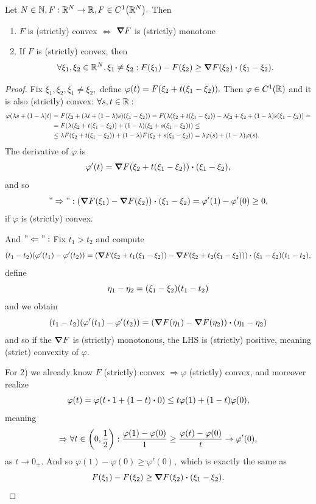 \documentclass{article}
\begin{document}
\begin{lemma}
	Let $N \in {\mathbb N}, F: {\mathbb R}^N \to {\mathbb R}, F \in C^1\qty({\mathbb R}^N).$ Then 
	\begin{enumerate}
		\item $F$ is (strictly) convex $\Leftrightarrow$ $\grad F$ is (strictly) monotone
		\item If $F$ is (strictly) convex, then
			\[
				\forall \xi_1, \xi_2 \in \R^N, \xi_1 \neq \xi_2: F\qty(\xi_1)-F\qty(\xi_2)\geq \grad F\qty(\xi_2)\vdot \qty(\xi_1 - \xi_2).
			\]
	\end{enumerate}
\end{lemma}
\begin{proof}
	Fix $\xi_1, \xi_2, \xi_1 \neq \xi_2,$ define $\varphi(t) = F\qty(\xi_2 + t\qty(\xi_1 - \xi_2)).$ Then $\varphi \in C^1\qty({\mathbb R})$ and it is also (strictly) convex: $\forall s,t \in {\mathbb R}:$ 
	\begin{align*}
		\varphi\qty(\lambda s + (1- \lambda)t) &= F\qty(\xi_2 + \qty(\lambda t + \qty(1-\lambda)s)\qty(\xi_1 - \xi_2)) = F\qty(\lambda\qty(\xi_2 + t\qty(\xi_1 - \xi_2))- \lambda \xi_2 + \xi_2 + \qty(1-\lambda)s\qty(\xi_1 - \xi_2)) = \\
						       &= F\qty(\lambda\qty(\xi_2 + t\qty(\xi_1 - \xi_2))+ \qty(1- \lambda)\qty(\xi_2 + s\qty(\xi_1 - \xi_2))) \leq \\
						       &\leq \lambda F\qty(\xi_2 + t\qty(\xi_1 - \xi_2)) + \qty(1- \lambda)F\qty(\xi_2 +s \qty(\xi_1 - \xi_2)) = \lambda \varphi(s) + (1-\lambda) \varphi(s).
	\end{align*}
	The derivative of $\varphi$ is 
	\[
		\varphi'(t) = \grad F\qty(\xi_2 +t\qty(\xi_1 - \xi_2))\vdot \qty(\xi_1 - \xi_2),
	\]
	and so
	\[
		"\Rightarrow": \qty(\grad F\qty(\xi_1) - \grad F\qty(\xi_2))\vdot\qty(\xi_1-\xi_2) = \varphi'(1)-\varphi'(0) \geq 0,
	\]
	if $\varphi$ is (strictly) convex.
	
	And $"\Leftarrow":$ Fix $t_1 > t_2$ and compute
	\[
		(t_1 - t_2)	(\varphi'\qty(t_1) - \varphi'\qty(t_2)) = \qty(\grad F\qty(\xi_2 + t_1\qty(\xi_1 - \xi_2))- \grad F\qty(\xi_2 + t_2\qty(\xi_1-\xi_2)))\vdot\qty(\xi_1-\xi_2)(t_1-t_2),
	\]
	define
	\[
		\eta_1 - \eta_2 = \qty(\xi_1 - \xi_2)\qty(t_1-t_2)
	\]
	and we obtain
	\[
		(t_1 - t_2)(\varphi'(t_1) - \varphi'(t_2)) = \qty(\grad F\qty(\eta_1)-\grad F\qty(\eta_2))\vdot \qty(\eta_1 - \eta_2)
	\]
	and so if the $\grad F$ is (strictly) monotonous, the LHS is (strictly) positive, meaning  (strict) convexity of $\varphi$.

	For 2) we already know $F$ (strictly) convex $\Rightarrow \varphi$ (strictly) convex, and moreover realize
	\[
		\varphi(t) = \varphi(t \vdot 1 + \qty(1- t)\vdot0) \leq t \varphi(1) + (1-t) \varphi(0),
	\]
	meaning
	\[
		\Rightarrow \forall t \in \qty(0,\frac{1}{2}): \frac{\varphi(1)-\varphi(0)}{1} \geq \frac{\varphi(t)-\varphi(0)}{t}\to \varphi'(0),
	\]
	as $t\to 0_+.$ And so $\varphi(1) - \varphi(0) \geq \varphi'(0),$ which is exactly the same as
	\[
		F\qty(\xi_1) - F\qty(\xi_2) \geq \grad F\qty(\xi_2)\vdot \qty(\xi_1 - \xi_2).
	\]
\end{proof}
\end{document}
